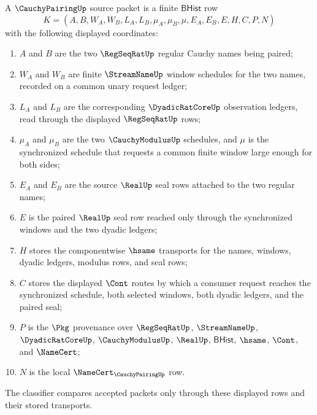 \begin{definition}
\label{def:cauchy-pairing-namecert-source}
A $\CauchyPairingUp$ source packet is a finite $\mathsf{BHist}$ row
$$
K=(A,B,W_A,W_B,L_A,L_B,\mu_A,\mu_B,\mu,E_A,E_B,E,H,C,P,N)
$$
with the following displayed coordinates:
\begin{enumerate}
\item $A$ and $B$ are the two $\RegSeqRatUp$ regular Cauchy names being paired;
\item $W_A$ and $W_B$ are finite $\StreamNameUp$ window schedules for the two names, recorded on a common unary request ledger;
\item $L_A$ and $L_B$ are the corresponding $\DyadicRatCoreUp$ observation ledgers, read through the displayed $\RegSeqRatUp$ rows;
\item $\mu_A$ and $\mu_B$ are the two $\CauchyModulusUp$ schedules, and $\mu$ is the synchronized schedule that requests a common finite window large enough for both sides;
\item $E_A$ and $E_B$ are the source $\RealUp$ seal rows attached to the two regular names;
\item $E$ is the paired $\RealUp$ seal row reached only through the synchronized windows and the two dyadic ledgers;
\item $H$ stores the componentwise $\hsame$ transports for the names, windows, dyadic ledgers, modulus rows, and seal rows;
\item $C$ stores the displayed $\Cont$ routes by which a consumer request reaches the synchronized schedule, both selected windows, both dyadic ledgers, and the paired seal;
\item $P$ is the $\Pkg$ provenance over $\RegSeqRatUp$, $\StreamNameUp$, $\DyadicRatCoreUp$, $\CauchyModulusUp$, $\RealUp$, $\mathsf{BHist}$, $\hsame$, $\Cont$, and $\NameCert$;
\item $N$ is the local $\NameCert_{\CauchyPairingUp}$ row.
\end{enumerate}
The classifier compares accepted packets only through these displayed rows and their stored transports.
\end{definition}

